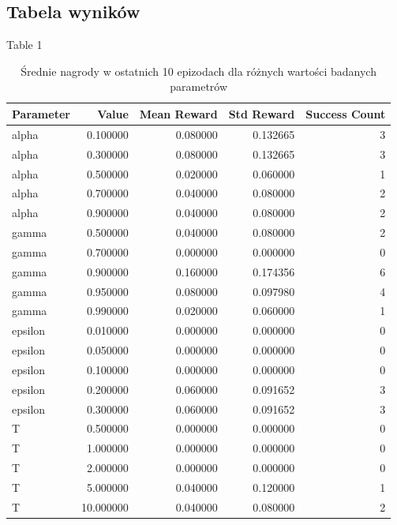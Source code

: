 \documentclass{article}
\begin{document}
\subsection{Tabela wyników}
Table 1
\begin{table}[htbp]
    \centering
    \caption{Średnie nagrody w ostatnich 10 epizodach dla różnych wartości badanych parametrów}
    \begin{tabular}{lrrrr}
        \toprule
        Parameter & Value & Mean Reward & Std Reward & Success Count \\
        \midrule
        alpha & 0.100000 & 0.080000 & 0.132665 & 3 \\
        alpha & 0.300000 & 0.080000 & 0.132665 & 3 \\
        alpha & 0.500000 & 0.020000 & 0.060000 & 1 \\
        alpha & 0.700000 & 0.040000 & 0.080000 & 2 \\
        alpha & 0.900000 & 0.040000 & 0.080000 & 2 \\
        gamma & 0.500000 & 0.040000 & 0.080000 & 2 \\
        gamma & 0.700000 & 0.000000 & 0.000000 & 0 \\
        gamma & 0.900000 & 0.160000 & 0.174356 & 6 \\
        gamma & 0.950000 & 0.080000 & 0.097980 & 4 \\
        gamma & 0.990000 & 0.020000 & 0.060000 & 1 \\
        epsilon & 0.010000 & 0.000000 & 0.000000 & 0 \\
        epsilon & 0.050000 & 0.000000 & 0.000000 & 0 \\
        epsilon & 0.100000 & 0.000000 & 0.000000 & 0 \\
        epsilon & 0.200000 & 0.060000 & 0.091652 & 3 \\
        epsilon & 0.300000 & 0.060000 & 0.091652 & 3 \\
        T & 0.500000 & 0.000000 & 0.000000 & 0 \\
        T & 1.000000 & 0.000000 & 0.000000 & 0 \\
        T & 2.000000 & 0.000000 & 0.000000 & 0 \\
        T & 5.000000 & 0.040000 & 0.120000 & 1 \\
        T & 10.000000 & 0.040000 & 0.080000 & 2 \\
        \bottomrule
        \end{tabular}
        
        
\end{table}
 
\end{document}
